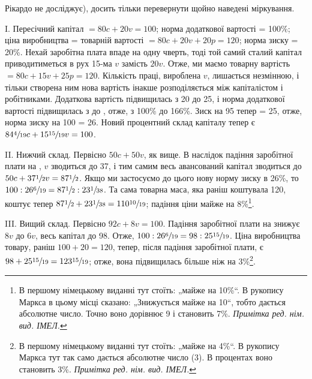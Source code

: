 \parcont{}  %
Рікардо не досліджує), досить тільки перевернути щойно наведені
міркування.

I. Пересічний капітал $= 80 c + 20 v = 100$; норма додаткової
вартості = 100\%; ціна виробництва = товарній вартості $= 80 c +
20 v + 20 p = 120$; норма зиску = 20\%. Нехай заробітна плата
впаде на одну чверть, тоді той самий сталий капітал приводитиметься
в рух 15-ма $v$ замість $20 v$. Отже, ми маємо товарну
вартість $ = 80 c + 15 v + 25 p = 120$. Кількість праці, вироблена $v$,
лишається  незмінною, і тільки створена ним нова вартість інакше
розподіляється між капіталістом і робітниками. Додаткова вартість
підвищилась з 20 до 25, і норма додаткової вартості
підвищилась з  до , отже, з 100\% до 166\%.
Зиск на 95 тепер = 25, отже, норма зиску на 100 = 26. Новий
процентний склад капіталу тепер є $84\sfrac{4}{19}c + 15\sfrac{15}{19}v = 100$.

II. Нижчий склад. Первісно $50 c + 50 v$, як вище. В наслідок
падіння заробітної плати на , $v$ зводиться до 37, і тим самим
весь авансований капітал зводиться до $50 c + 37\sfrac{1}{2}v = 87\sfrac{1}{2}$. Якщо
ми застосуємо до цього нову норму зиску в 26\%, то
$100 : 26\sfrac{6}{19} = 87\sfrac{1}{2} : 23\sfrac{1}{38}$. Та сама товарна маса,
яка раніш коштувала 120, коштує
тепер $87\sfrac{1}{2} + 23\sfrac{1}{38} = 110\sfrac{10}{19}$; падіння ціни
майже на 8\%\footnote*{
В першому німецькому виданні тут стоїть: „майже на 10\%“. В рукопису
Маркса в цьому місці сказано: „Знижується майже на 10“, тобто дається абсолютне
число. Точно воно дорівнює 9 і становить 7\%. \emph{Примітка ред. нім. вид. ІМЕЛ.}
}.

III. Вищий склад. Первісно $92 c + 8 v = 100$. Падіння заробітної
плати на  знижує $8 v$ до $6 v$, весь капітал до 98. Отже,
$100 : 26\sfrac{6}{19} = 98 : 25\sfrac{15}{19}$. Ціна виробництва товару,
раніш $100 + 20 = 120$, тепер, після падіння заробітної плати, є
$98 + 25\sfrac{15}{19} = 123\sfrac{15}{19}$;
отже, вона підвищилась більше ніж на 3\%\footnote*{
В першому німецькому виданні тут стоїть: „майже на 4\%“. В рукопису
Маркса тут так само дається абсолютне число (3). В процентах воно
становить 3\%. \emph{Примітка ред. нім. вид. ІМЕЛ.}
}.

